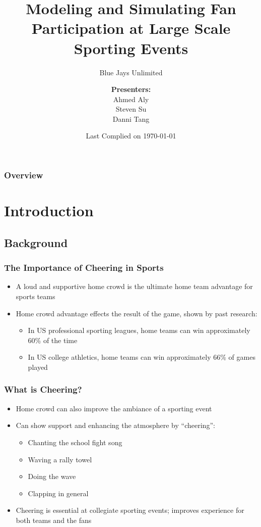 \documentclass[compress,handout,10pt]{beamer}
\title{{\LARGE Modeling and Simulating Fan Participation at Large Scale Sporting Events\newline} }
\subtitle{{\large Blue Jays Unlimited} }
\author{ 
    {\bf{Presenters:}}\\ 
Ahmed Aly\\
Steven Su \\
Danni Tang\\ 
    \vspace{5pt}
}
\institute{JHU AMS 550.400 Fall 2012}
\date{Last Complied on \today}
\let\olditem\item
\renewcommand{\item}{\setlength{\itemsep}{0.5\baselineskip}\olditem}
\begin{document}
\begin{frame}[plain]
	\titlepage
\end{frame}

\begin{frame} [allowframebreaks]
	\frametitle{Overview}
{\small \tableofcontents}
\end{frame}

\section{Introduction}

\subsection{Background}

\begin{frame}
	\frametitle{The Importance of Cheering in Sports}
		\begin {itemize}
			\item A loud and supportive home crowd is the ultimate home team advantage for sports teams
			\item Home crowd advantage effects the result of the game, shown by past research:
			\begin{itemize}
				\item In US professional sporting leagues, home teams can win approximately 60\% of the time \cite{Jamieson_2010}
				\item In US college athletics, home teams can win approximately 66\% of games played \cite{Snyder_1985}
			\end{itemize}
		\end {itemize}
\end{frame}

\begin{frame}
	\frametitle{What is Cheering?}
		\begin{itemize}
		\item Home crowd can also improve the ambiance of a sporting event
		\item Can show support and enhancing the atmosphere by ``cheering'':
		\begin{itemize}
			\item Chanting the school fight song
			\item Waving a rally towel
			\item Doing the wave
			\item Clapping in general
		\end{itemize}
	\item Cheering is essential at collegiate sporting events; improves experience for both teams and the fans
	\end{itemize}
\end{frame}
\end{document}
